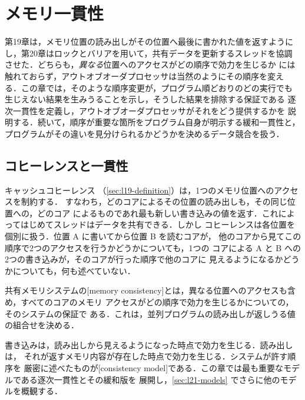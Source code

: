 \documentclass[../main.tex]{subfiles}
\begin{document}
\chapter{メモリ一貫性}

第19章は，メモリ位置の読み出しがその位置へ最後に書かれた値を返すように
し，第20章はロックとバリアを用いて，共有データを更新するスレッドを協調
させた．どちらも，\emph{異なる}位置へのアクセスがどの順序で効力を生じるか
には触れておらず，アウトオブオーダプロセッサは当然のようにその順序を変え
る．この章では，そのような順序変更が，プログラム順どおりのどの実行でも
生じえない結果を生みうることを示し，そうした結果を排除する保証である
逐次一貫性を定義し，アウトオブオーダプロセッサがそれをどう提供するかを
説明する．続いて，順序が重要な箇所をプログラム自身が明示する緩和一貫性と，
プログラムがその違いを見分けられるかどうかを決めるデータ競合を扱う．

\section{コヒーレンスと一貫性}
\label{sec:l21-coherence}

キャッシュコヒーレンス%
（\cref{sec:l19-definition}）は，1つのメモリ位置へのアクセスを制約する．
すなわち，どのコアによるその位置の読み出しも，その同じ位置への，どのコア
によるものであれ最も新しい書き込みの値を返す．これによってはじめてスレッドはデータを共有できる．しかし
コヒーレンスは各位置を個別に扱う．位置 A に書いてから位置 B を読むコアが，
他のコアから見てこの順序で2つのアクセスを行うかどうかについても，1つの
コアによる A と B への2つの書き込みが，そのコアが行った順序で他のコアに
見えるようになるかどうかについても，何も述べていない．

\begin{definition}[メモリ一貫性]
  共有メモリシステムの[memory
  consistency]とは，異なる位置へのアクセスも含め，すべてのコアのメモリ
  アクセスがどの順序で効力を生じるかについての，そのシステムの保証で
  ある．これは，並列プログラムの読み出しが返しうる値の組合せを決める．
\end{definition}

書き込みは，読み出しから見えるようになった時点で効力を生じる．読み出しは，
それが返すメモリ内容が存在した時点で効力を生じる．システムが許す順序を
厳密に述べたものが[consistency
model]である．この章では最も重要なモデルである逐次一貫性とその緩和版を
展開し，\cref{sec:l21-models} でさらに他のモデルを概観する．
\end{document}
